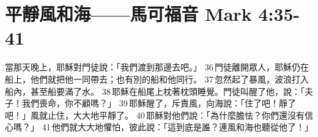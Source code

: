 
\section{平靜風和海——馬可福音 Mark 4:35-41}
當那天晚上，耶穌對門徒說：「我們渡到那邊去吧。」 36 門徒離開眾人，耶穌仍在船上，他們就把他一同帶去；也有別的船和他同行。 37 忽然起了暴風，波浪打入船內，甚至船要滿了水。 38 耶穌在船尾上枕著枕頭睡覺。門徒叫醒了他，說：「夫子！我們喪命，你不顧嗎？」 39 耶穌醒了，斥責風，向海說：「住了吧！靜了吧！」風就止住，大大地平靜了。 40 耶穌對他們說：「為什麼膽怯？你們還沒有信心嗎？」 41 他們就大大地懼怕，彼此說：「這到底是誰？連風和海也聽從他了！」